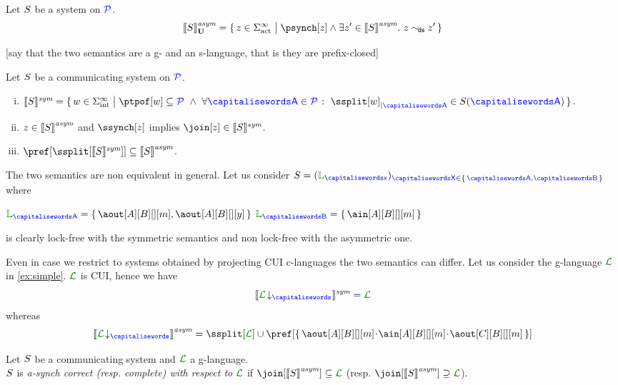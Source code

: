\begin{lemma}
Let $S$ be a system on $\mathcal{\color{blue}{P}}$.
$$\gasem{\aCS} = \Set{z\in\alfact^\infty \sst  \psynch[z] \land \exists z'\in\asem{\aCS}.\  z\commds z'}$$ 
\end{lemma}

[say that the two semantics are a g- and an s-language, that is they are prefix-closed]

\begin{lemma}
\label{fac:asymmsubsymm}
Let  $S$ be a communicating system on $\mathcal{\color{blue}{P}}$.
\begin{enumerate}[i)]
\item
$\ssem{\aCS} =  
\Set{\acword \in \alfint^\infty \sst  
\ptpof[\acword] \subseteq \ptpset \ \land\ \forall \p \in \ptpset \qst \filter{\ssplit[\acword]}{\p} \in \aCS(\p)}$.
\item
\label{fac:asymmsubsymm-aimps}
$z\in{\llbracket S\rrbracket}^{\textit{asym}}$ and $\ssynch[z]$ implies $\join[z]\in\ssem{\aCS}$.
\item
\label{fac:asymmsubsymm-asubs}
$\pref[{\ssplit[{\ssem{\aCS}}]}] \subseteq \asem{\aCS}$.
\end{enumerate}
\end{lemma}

\begin{example}
\label{ex:simple2}
The two semantics are non equivalent in general.
Let us consider $\aCS = ({\alang}_{\px})_{\ptp[X] \in \Set{\p,\q}}$ where\\
\centerline{$\alang_{\p}= \Set{\aout[A][B][][m], \aout[A][B][][y]}$ \qquad $\alang_{\q}= \Set{\ain[A][B][][m]}$ }
is clearly lock-free with the symmetric semantics and non lock-free with the asymmetric one.

 Even in case we restrict to systems
obtained by projecting CUI c-languages the two semantics can differ.
Let us consider the g-language $\clang$ in \cref{ex:simple}.
$\clang$ is CUI, hence we have 
  $$\ssem{\proj{\clang}{}} = \clang$$ 
whereas 
  $$\asem{\proj{\clang}{}} = \ssplit[\clang] \cup \pref[\Set{\aout[A][B][][m]\cat\ain[A][B][][m]\cat\aout[C][B][][m]}]$$
\finex
\end{example} 

\begin{definition}\label{def:cc}
  Let $S$ be a communicating system and $\clang$ a g-language.\\
  $S$ is \emph{a-synch correct (resp. complete) with respect to
    $\clang$} if $\join[{\asem{\aCS}}]\subseteq \clang$ (resp. 
  $\join[{\asem{\aCS}}]\supseteq \clang$).
\end{definition}


